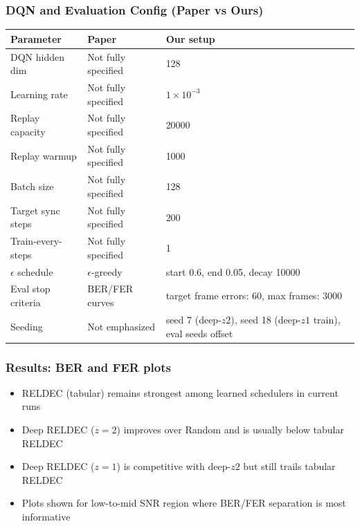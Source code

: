 \documentclass{beamer}
\begin{document}
\begin{frame}
\frametitle{DQN and Evaluation Config (Paper vs Ours)}

\scriptsize
\begin{tabular}{|p{2.8cm}|p{3.4cm}|p{4.2cm}|}
\hline
\textbf{Parameter} & \textbf{Paper} & \textbf{Our setup} \\
\hline
DQN hidden dim & Not fully specified & 128 \\
\hline
Learning rate & Not fully specified & $1\times10^{-3}$ \\
\hline
Replay capacity & Not fully specified & 20000 \\
\hline
Replay warmup & Not fully specified & 1000 \\
\hline
Batch size & Not fully specified & 128 \\
\hline
Target sync steps & Not fully specified & 200 \\
\hline
Train-every-steps & Not fully specified & 1 \\
\hline
$\epsilon$ schedule & $\epsilon$-greedy & start 0.6, end 0.05, decay 10000 \\
\hline
Eval stop criteria & BER/FER curves & target frame errors: 60, max frames: 3000 \\
\hline
Seeding & Not emphasized & seed 7 (deep-$z2$), seed 18 (deep-$z1$ train), eval seeds offset \\
\hline
\end{tabular}

\end{frame}



\begin{frame}
\frametitle{Results: BER and FER plots }

\begin{itemize}
    \item RELDEC (tabular) remains strongest among learned schedulers in current runs
    \item Deep RELDEC ($z=2$) improves over Random and is usually below tabular RELDEC
    \item Deep RELDEC ($z=1$) is competitive with deep-$z2$ but still trails tabular RELDEC
    \item Plots shown for low-to-mid SNR region where BER/FER separation is most informative
\end{itemize}

\end{frame}
\end{document}
